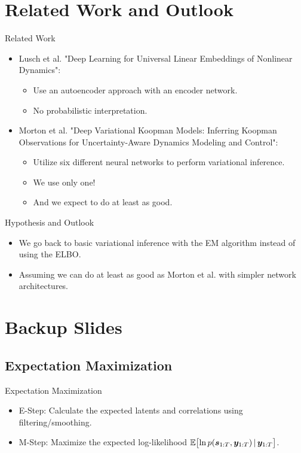 \documentclass[
	aspectratio=43,
	color={accentcolor=1c},
	logo=false,
	colorframetitle=true,
]{tudabeamer}
\begin{document}
	\section{Related Work and Outlook}
		\begin{frame}{Related Work}
			\begin{itemize}
				\item<+-> Lusch et al. "Deep Learning for Universal Linear Embeddings of Nonlinear Dynamics":
					\begin{itemize}
						\item Use an autoencoder approach with an encoder network.
						\item No probabilistic interpretation.
					\end{itemize}
				\item<+-> Morton et al. "Deep Variational Koopman Models: Inferring Koopman Observations for Uncertainty-Aware Dynamics Modeling and Control":
					\begin{itemize}
						\item Utilize six different neural networks to perform variational inference.
						\item We use only one!
						\item And we expect to do at least as good.
					\end{itemize}
			\end{itemize}
		\end{frame}

		\begin{frame}{Hypothesis and Outlook}
			\begin{itemize}
				\item We go back to basic variational inference with the EM algorithm instead of using the ELBO.
				\item Assuming we can do at least as good as Morton et al. with simpler network architectures.
			\end{itemize}
		\end{frame}





	\appendix

	\section{Backup Slides} \sectionslide

		\subsection{Expectation Maximization}
			\begin{frame}{Expectation Maximization}
				\begin{itemize}
					\item E-Step: Calculate the expected latents and correlations using filtering/smoothing.
					\item M-Step: Maximize the expected log-likelihood \( \mathbb{E}\big[\! \ln p(\bm{s}_{1:T}, \bm{y}_{1:T}) \,\vert\, \bm{y}_{1:T} \big] \).
				\end{itemize}
			\end{frame}
\end{document}
